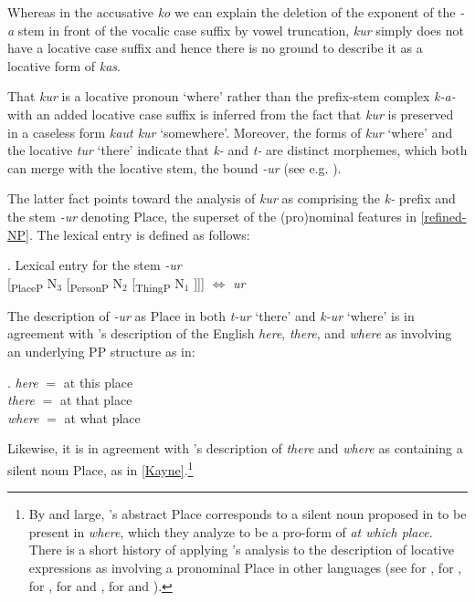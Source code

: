 \noindent Whereas in the accusative \textit{ko} we can explain the deletion of the exponent of the  \textit{-a} stem in front of the vocalic case suffix by vowel  truncation, \textit{kur} simply does not have a locative case suffix and hence there is no ground to describe it as a locative form of \textit{kas}.  
\par 
That \textit{kur} is a locative pronoun `where' rather than the prefix-stem complex \textit{k-a-} with an added locative case suffix is inferred from the fact that \textit{kur} is preserved in a caseless form \textit{kaut kur} `somewhere'. Moreover, the forms of \textit{kur} `where' and the locative  \textit{tur} `there' indicate that \textit{k-} and \textit{t-} are distinct morphemes, which both can merge with the locative stem, the bound  \textit{-ur} (see e.g. \citealt{Praulins2012}).
\par
The latter fact points toward the analysis of \textit{kur} as comprising the \textit{k-} prefix and the stem \textit{-ur} denoting Place, the superset of the (pro)nominal features in \ref{refined-NP}. The lexical entry is defined as follows:

\ex. Lexical entry for the  stem \textit{-ur}\label{Lat:lex-ur}\\[0.5ex]
[\textsubscript{PlaceP} N$_{3}$ [\textsubscript{PersonP} N$_{2}$ [\textsubscript{ThingP} N$_{1}$ ]]] $\Leftrightarrow$ \textit{ur}

The description of \textit{-ur} as Place in both \textit{t-ur} `there' and \textit{k-ur} `where' is in agreement with \citeauthor{Katz-Postal1964}'s \citeyearpar{Katz-Postal1964} description of the English \textit{here}, \textit{there}, and \textit{where} as involving an underlying PP structure as in:

\ex. 
\textit{here}	$=$	at this place\\
\textit{there} $=$ at that place\\
\textit{where} $=$ at what place

\noindent Likewise, it is in agreement with \citeauthor{Kayne2007}'s \citeyearpar{Kayne2007} description of \textit{there} and \textit{where} as containing a silent noun Place, as in \ref{Kayne}.\footnote{By and large, \citeauthor{Kayne2007}'s \citeyearpar{Kayne2007} abstract Place corresponds to a silent noun proposed in \cite{Katz-Postal1964} to be present in \textit{where}, which they analyze to be a pro-form of \textit{at which place}. There is a short history of applying \citeauthor{Kayne2007}'s \citeyearpar{Kayne2007} analysis to the description of locative expressions as involving a pronominal Place in other languages (see \citealt{Pantcheva2008} for , \citealt{Leu2015} for , \citealt{CahaPantcheva-Shona} for , \citealt{BR-T2008} for  and , \citealt{Wiland-PSiCL} for  and ).
}%

